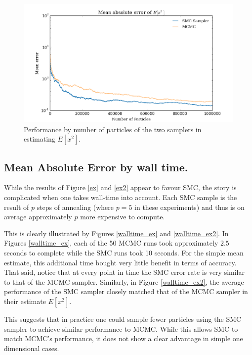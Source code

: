 \documentclass[12pt]{elsarticle}
\begin{document}
\begin{figure}[htbp]
\begin{center}
\includegraphics[width = \textwidth]{plots/E_X2.png}
\caption{Performance by number of particles of the two samplers in estimating $E[x^2]$.}
\label{default}
\end{center}
\end{figure}


\subsection*{Mean Absolute Error by wall time. }

While the results of Figure \ref{ex} and \ref{ex2} appear to favour SMC, the story is complicated when one takes wall-time into account. Each SMC sample is the result of $p$ steps of annealing (where $p=5$ in these experiments) and thus is on average approximately $p$ more expensive to compute.

This is clearly illustrated by Figures \ref{walltime_ex} and  \ref{walltime_ex2}. In Figures \ref{walltime_ex}, each of the 50 MCMC runs took approximately $2.5$ seconds to complete while the SMC runs took 10 seconds. For the simple mean estimate, this additional time bought very little benefit in terms of accuracy. That said, notice that at every point in time the SMC error rate is very similar to that of the MCMC sampler. Similarly, in Figure \ref{walltime_ex2}, the average performance of the SMC sampler closely matched that of the MCMC sampler in their estimate $E[x^2]$.

This suggests that in practice one could sample fewer particles using the SMC sampler to achieve similar performance to MCMC. While this allows SMC to match MCMC's performance, it does not show a clear advantage in simple one dimensional cases.
\end{document}
